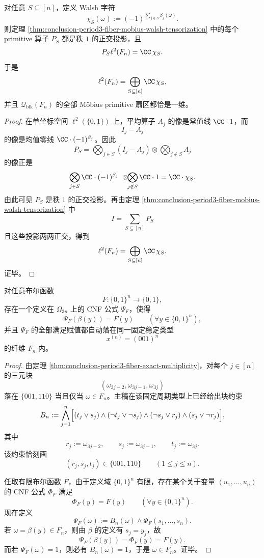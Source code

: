 \begin{theorem}\label{thm:conclusion-period3-fiber-walsh-rankone-primitives}
对任意 \(S\subseteq[n]\)，定义 Walsh 字符
\[
\chi_S(\omega):=(-1)^{\sum_{j\in S}\beta_j(\omega)}.
\]
则定理 \ref{thm:conclusion-period3-fiber-mobius-walsh-tensorization} 中的每个 primitive 算子 \(P_S\) 都是秩 \(1\) 的正交投影，且
\[
P_S\ell^2(F_n)=\CC\,\chi_S.
\]
于是
\[
\ell^2(F_n)=\bigoplus_{S\subseteq[n]}\CC\,\chi_S,
\]
并且 \(\mathcal Q_{\mathrm{blk}}(F_n)\) 的全部 Möbius primitive 扇区都恰是一维。
\end{theorem}
\begin{proof}
在单坐标空间 \(\ell^2(\{0,1\})\) 上，平均算子 \(A_j\) 的像是常值线 \(\CC\cdot 1\)，而
\[
I_j-A_j
\]
的像是均值零线 \(\CC\cdot(-1)^{\beta_j}\)。因此
\[
P_S=
\bigotimes_{j\in S}(I_j-A_j)\otimes \bigotimes_{j\notin S}A_j
\]
的像正是
\[
\bigotimes_{j\in S}\CC\cdot(-1)^{\beta_j}\ \otimes \!\!\bigotimes_{j\notin S}\CC\cdot1
=
\CC\cdot\chi_S.
\]
由此可见 \(P_S\) 是秩 \(1\) 的正交投影。再由定理 \ref{thm:conclusion-period3-fiber-mobius-walsh-tensorization} 中
\[
I=\sum_{S\subseteq[n]}P_S
\]
且这些投影两两正交，得到
\[
\ell^2(F_n)=\bigoplus_{S\subseteq[n]}\CC\,\chi_S.
\]
证毕。
\end{proof}

\begin{theorem}[单一稳定类型上的完备布尔承载]\label{thm:conclusion-period3-fiber-single-stability-complete-boolean-carrier}
对任意布尔函数
\[
F:\{0,1\}^n\to\{0,1\},
\]
存在一个定义在 \(\Omega_{3n}\) 上的 CNF 公式 \(\Psi_F\)，使得
\[
\Psi_F(\beta(y))=F(y)\qquad(\forall y\in\{0,1\}^n),
\]
并且 \(\Psi_F\) 的全部满足赋值都自动落在同一固定稳定类型
\[
x^{(n)}=(001)^n
\]
的纤维 \(F_n\) 内。
\end{theorem}
\begin{proof}
由定理 \ref{thm:conclusion-period3-fiber-exact-multiplicity}，对每个 \(j\in[n]\) 的三元块
\[
(\omega_{3j-2},\omega_{3j-1},\omega_{3j})
\]
落在 \(\{001,110\}\) 当且仅当 \(\omega\in F_n\)。主稿在该固定周期类型上已经给出块约束
\[
B_n:=\bigwedge_{j=1}^{n}\Bigl[(t_j\vee s_j)\wedge(\neg t_j\vee\neg s_j)\wedge(\neg s_j\vee r_j)\wedge(s_j\vee\neg r_j)\Bigr],
\]
其中
\[
r_j:=\omega_{3j-2},\qquad s_j:=\omega_{3j-1},\qquad t_j:=\omega_{3j}.
\]
该约束恰刻画
\[
(r_j,s_j,t_j)\in\{001,110\}\qquad(1\le j\le n).
\]

任取有限布尔函数 \(F\)，由于定义域 \(\{0,1\}^n\) 有限，存在某个关于变量 \((u_1,\dots,u_n)\) 的 CNF 公式 \(\Phi_F\) 满足
\[
\Phi_F(y)=F(y)\qquad(\forall y\in\{0,1\}^n).
\]
现在定义
\[
\Psi_F(\omega):=B_n(\omega)\wedge \Phi_F(s_1,\dots,s_n).
\]
若 \(\omega=\beta(y)\in F_n\)，则由 \(\beta\) 的定义有 \(s_j=y_j\)，故
\[
\Psi_F(\beta(y))=\Phi_F(y)=F(y).
\]
而若 \(\Psi_F(\omega)=1\)，则必有 \(B_n(\omega)=1\)，于是 \(\omega\in F_n\)。证毕。
\end{proof}

